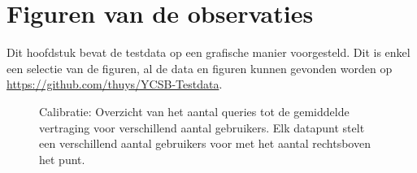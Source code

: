 \chapter{Figuren van de observaties}\label{sec:figobservaties}
Dit hoofdstuk bevat de testdata op een grafische manier voorgesteld. Dit is enkel een selectie van de figuren, al de data en figuren kunnen gevonden worden op \url{https://github.com/thuys/YCSB-Testdata}.  
\begin{figure}[h!] 
\centering
	\caption{Calibratie: Overzicht van het aantal queries tot de gemiddelde vertraging voor verschillend aantal gebruikers. Elk datapunt stelt een verschillend aantal gebruikers voor met het aantal rechtsboven het punt. }
	\label{fig:calibratie-gebruikers-resultaat}
\end{figure}

